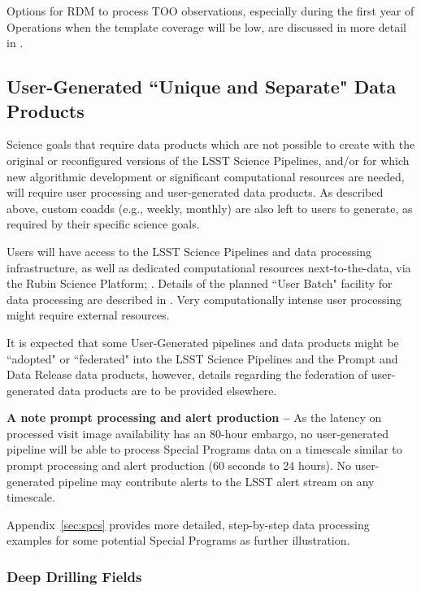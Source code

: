 Options for RDM to process TOO observations, especially during the first year of Operations 
when the template coverage will be low, are discussed in more detail in 
.


\subsection{User-Generated ``Unique and Separate" Data Products}\label{ssec:proc_user}

Science goals that require data products which are not possible to create with 
the original or reconfigured versions of the LSST Science Pipelines, 
and/or for which new algorithmic development or significant computational resources 
are needed, will require user processing and user-generated data products.
As described above, custom coadds (e.g., weekly, monthly) are also left to users 
to generate, as required by their specific science goals.

Users will have access to the LSST Science Pipelines and data processing 
infrastructure, as well as dedicated computational resources next-to-the-data, 
via the Rubin Science Platform; .
Details of the planned ``User Batch" facility for data processing are described in 
.
Very computationally intense user processing might require external resources. 

It is expected that some User-Generated pipelines and data products 
might be ``adopted" or ``federated" into the LSST Science Pipelines and the Prompt 
and Data Release data products, however, details regarding the federation of 
user-generated data products are to be provided elsewhere.

\textbf{A note prompt processing and alert production -- }
As the latency on processed visit image availability has an 80-hour
embargo, no user-generated pipeline will be able to process Special Programs 
data on a timescale similar to prompt processing and alert production 
(60 seconds to 24 hours).
No user-generated pipeline may contribute alerts to the LSST alert stream on 
any timescale.

Appendix~\ref{sec:spcs} provides more detailed, step-by-step data processing examples 
for some potential Special Programs as further illustration.

\subsubsection{Deep Drilling Fields}

